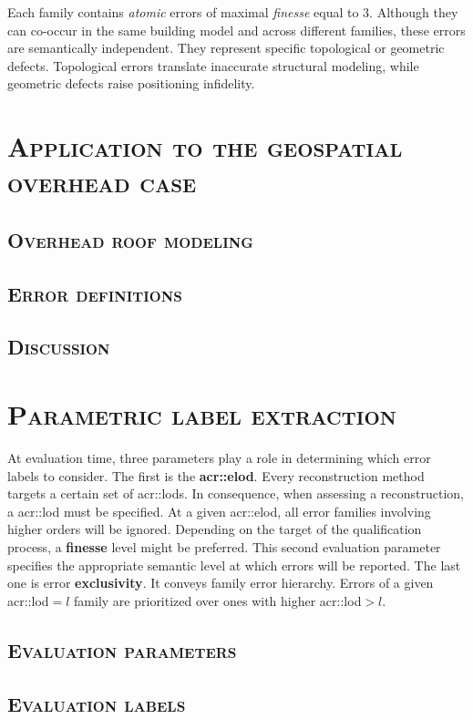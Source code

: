         Each family contains \textit{atomic} errors of maximal \textit{finesse} equal to $3$.
        Although they can co-occur in the same building model and across different families, these errors are semantically independent.
        They represent specific topological or geometric defects.
        Topological errors translate inaccurate structural modeling, while geometric defects raise positioning infidelity.

\section{\textsc{Application to the geospatial overhead case}}
    \subsection{\textsc{Overhead roof modeling}}
    \subsection{\textsc{Error definitions}}
    \subsection{\textsc{Discussion}}

\section{\textsc{Parametric label extraction}}
    At evaluation time, three parameters play a role in determining which error labels to consider.
    The first is the \textbf{\gls{acr::elod}}. Every reconstruction method targets a certain set of \glspl*{acr::lod}.
    In consequence, when assessing a reconstruction, a \gls{acr::lod} must be specified. At a given \gls{acr::elod}, all error families involving higher orders will be ignored.
    Depending on the target of the qualification process, a \textbf{finesse} level might be preferred.
    This second evaluation parameter specifies the appropriate semantic level at which errors will be reported.
    The last one is error \textbf{exclusivity}. It conveys family error hierarchy. Errors of a given \gls{acr::lod}$ = l$ family are prioritized over ones with higher \gls{acr::lod}$ > l$.

    \subsection{\textsc{Evaluation parameters}}
    \subsection{\textsc{Evaluation labels}}

